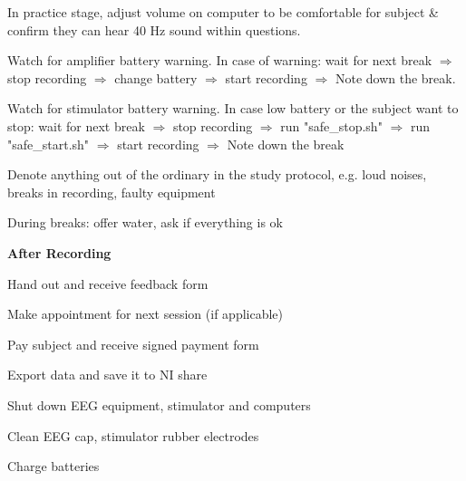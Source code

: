 \documentclass[journal, onecolumn, 11pt]{IEEEtran}
\begin{document}
\begin{itemize}
\begin{todolist}
			\item Watch for amplifier battery warning. In case of warning: wait for next break $\Rightarrow$  stop recording $\Rightarrow$  change battery $\Rightarrow$  start recording  $\Rightarrow$  Note down the break. 
			\item Watch for stimulator battery warning. In case low battery or the subject want to stop: wait for next break $\Rightarrow$ stop recording $\Rightarrow$ run "safe\_stop.sh" $\Rightarrow$ run "safe\_start.sh" $\Rightarrow$  start recording  $\Rightarrow$  Note down the break
			\item Denote anything out of the ordinary in the study protocol, e.g. loud noises, breaks in recording, faulty equipment 
			\item During breaks: offer water, ask if everything is ok
		\end{todolist}
	
	\item \textbf{After Recording}
		\begin{todolist}
			\item Hand out and receive feedback form
			\item Make appointment for next session (if applicable)
			\item Pay subject and receive signed payment form
			\item Export data and save it to NI share
			\item Shut down EEG equipment, stimulator and computers
			\item Clean EEG cap, stimulator rubber electrodes
			\item Charge batteries
		\end{todolist}
\end{itemize}
	\printbibliography
	
	
	
	
	
\end{document}
